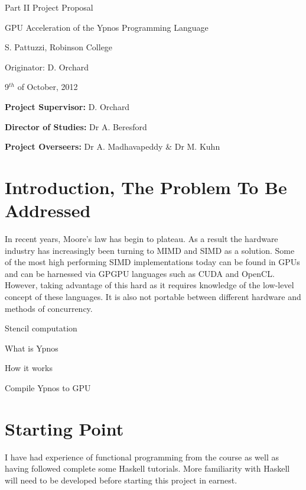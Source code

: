 

\vfil

\centerline{\Large Part II Project Proposal}
\vspace{0.4in}
\centerline{\Large GPU Acceleration of the Ypnos Programming Language}
\vspace{0.4in}
\centerline{\large S. Pattuzzi, Robinson College}
\vspace{0.3in}
\centerline{\large Originator: D. Orchard}
\vspace{0.3in}
\centerline{\large 9$^{th}$ of October, 2012} 

\vfil


\noindent
{\bf Project Supervisor:} D. Orchard
\vspace{0.2in}

\noindent
{\bf Director of Studies:} Dr A. Beresford
\vspace{0.2in}
\noindent
 
\noindent
{\bf Project Overseers:} Dr A. Madhavapeddy \& Dr M. Kuhn



\section*{Introduction, The Problem To Be Addressed}

In recent years, Moore's law has begin to plateau. As a result the hardware 
industry has increasingly been turning to MIMD and SIMD as a solution. Some of 
the most high performing SIMD implementations today can be found in GPUs and 
can be harnessed via GPGPU languages such as CUDA and OpenCL. However, taking 
advantage of this hard as it requires knowledge of the low-level concept of 
these languages. It is also not portable between different hardware and methods 
of concurrency.

Stencil computation

What is Ypnos

How it works

Compile Ypnos to GPU

\section*{Starting Point}

I have had experience of functional programming from the course as well as 
having followed complete some Haskell tutorials. More familiarity with Haskell 
will need to be developed before starting this project in earnest.

